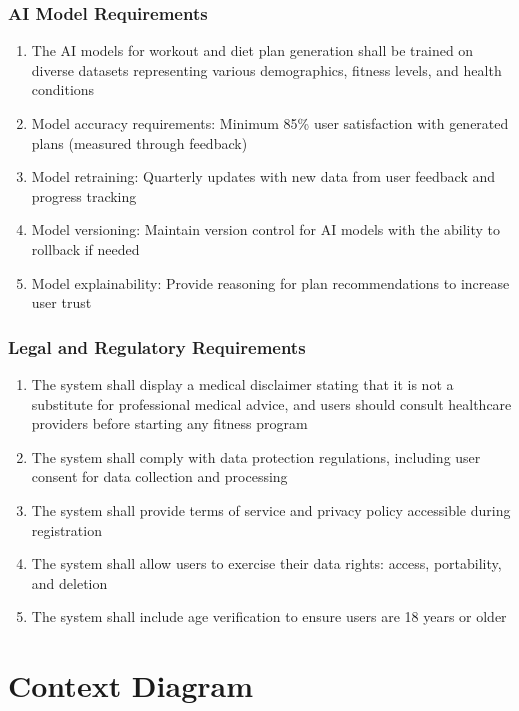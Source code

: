 \documentclass[12pt,a4paper]{article}
\begin{document}
\subsubsection{AI Model Requirements}
\begin{enumerate}
    \item The AI models for workout and diet plan generation shall be trained on diverse datasets representing various demographics, fitness levels, and health conditions
    \item Model accuracy requirements: Minimum 85\% user satisfaction with generated plans (measured through feedback)
    \item Model retraining: Quarterly updates with new data from user feedback and progress tracking
    \item Model versioning: Maintain version control for AI models with the ability to rollback if needed
    \item Model explainability: Provide reasoning for plan recommendations to increase user trust
\end{enumerate}

\subsubsection{Legal and Regulatory Requirements}
\begin{enumerate}
    \item The system shall display a medical disclaimer stating that it is not a substitute for professional medical advice, and users should consult healthcare providers before starting any fitness program
    \item The system shall comply with data protection regulations, including user consent for data collection and processing
    \item The system shall provide terms of service and privacy policy accessible during registration
    \item The system shall allow users to exercise their data rights: access, portability, and deletion
    \item The system shall include age verification to ensure users are 18 years or older
\end{enumerate}

\newpage

\appendix

\section{Context Diagram}
\label{appendix:context}
\end{document}
